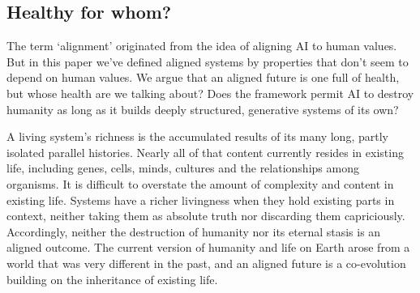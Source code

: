 \documentclass[11pt]{article}
\begin{document}
\subsection*{Healthy for whom?}
\label{sec:healthyforwhom}

The term `alignment' originated from the idea of aligning AI to human values. But in this paper we've defined aligned systems by properties that don't seem to depend on human values. We argue that an aligned future is one full of health, but whose health are we talking about? Does the framework permit AI to destroy humanity as long as it builds deeply structured, generative systems of its own?

A living system's richness is the accumulated results of its many long, partly isolated parallel histories. Nearly all of that content currently resides in existing life, including genes, cells, minds, cultures and the relationships among organisms. It is difficult to overstate the amount of complexity and content in existing life. Systems have a richer livingness when they hold existing parts in context, neither taking them as absolute truth nor discarding them capriciously. Accordingly, neither the destruction of humanity nor its eternal stasis is an aligned outcome. The current version of humanity and life on Earth arose from a world that was very different in the past, and an aligned future is a co-evolution building on the inheritance of existing life.










\end{document}
